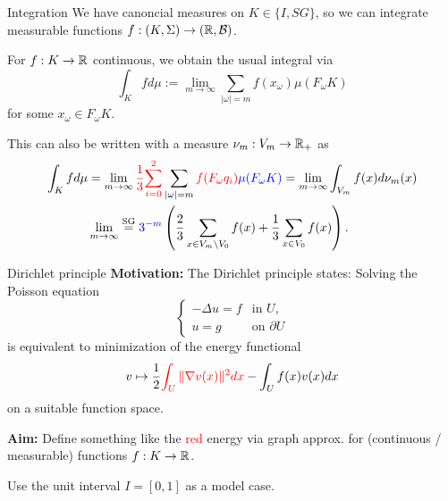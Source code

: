 \begin{frame}{Integration}
    We have canoncial measures on \(K \in \{I, SG \} \), so we can integrate measurable functions \(f: (K, \Sigma) \to (\mathbb{R}, \mathcal{B}) \).
    \begin{lemma}
        For \(f: K \to \mathbb{R} \) continuous, we obtain the usual integral via
        \[ \int_K f d\mu := \lim_{m \to \infty} \sum_{|\omega | = m} f(x_\omega) \mu(F_\omega K) \]
        for some \(x_\omega \in F_\omega K \).

        This can also be written with a measure \(\nu_m: V_m \to \mathbb{R}_+ \) as
        \begin{align*}
            \int_K f d\mu &= \lim_{m \to \infty} \textcolor{red}{\frac{1}{3}} \textcolor{red}{\sum_{i=0}^2} \sum_{| \omega | = m} \textcolor{red}{f(F_\omega q_i)} \textcolor{blue}{\mu(F_\omega K)}
            = \lim_{m\to \infty} \int_{V_m} f(x) d\nu_m(x) \\
            & \lim_{m\to\infty}\overset{\text{SG}}= \textcolor{blue}{3^{-m}} \left(\frac{2}{3} \sum_{x\in V_m \setminus V_0} f(x) + \frac{1}{3} \sum_{x \in V_0} f(x) \right).
        \end{align*}
    \end{lemma}
\end{frame}

\begin{frame}{Dirichlet principle}
    \textbf{Motivation:} The Dirichlet principle states: Solving the Poisson equation
    \[ \begin{cases}
            -\Delta u = f &\text{in } U,\\
            u = g &\text{on } \partial U
        \end{cases} \]
    is equivalent to minimization of the energy functional
    \[ v \mapsto \frac{1}{2} \textcolor{red}{\int_U \| \nabla v(x) \|^2 dx} - \int_U f(x)v(x) dx \]
    on a suitable function space.

    \textbf{Aim:} Define something like the \textcolor{red}{red} energy via graph approx. for (continuous / measurable) functions \(f: K \to \mathbb{R} \).

    Use the unit interval \(I = [0, 1] \) as a model case.
\end{frame}

